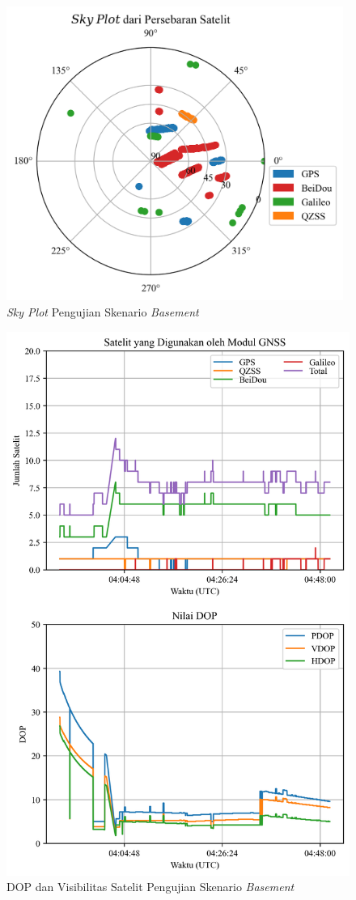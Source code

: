\begin{figure}[H]
	\centering
	\includegraphics[width=11cm]{contents/chapter-4/1-skenario-basement/skyplot.png}
	\caption{\textit{Sky Plot} Pengujian Skenario \textit{Basement}}
	\label{Fig: basement-skyplot}
\end{figure}

\begin{figure}[H]
	\centering
	\includegraphics[width=12cm]{contents/chapter-4/1-skenario-basement/sats_dop.png}
	\caption{DOP dan Visibilitas Satelit Pengujian Skenario \textit{Basement}}
	\label{Fig: basement-sats_dop}
\end{figure}

